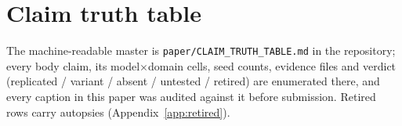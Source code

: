 \section{Claim truth table}
\label{app:truth}
The machine-readable master is \texttt{paper/CLAIM\_TRUTH\_TABLE.md} in the
repository; every body claim, its model$\times$domain cells, seed counts,
evidence files and verdict (replicated / variant / absent / untested /
retired) are enumerated there, and every caption in this paper was audited
against it before submission. Retired rows carry autopsies
(Appendix~\ref{app:retired}).